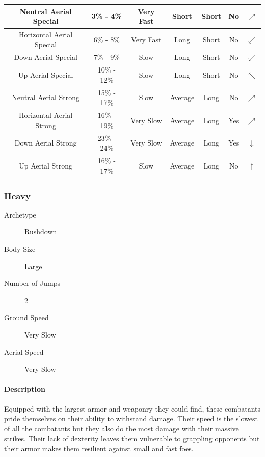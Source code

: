 \begin{table}[h!]
\begin{tabular}{| c | c | c | c | c | c | c |}
        Neutral Aerial Special & 3\% - 4\% & Very Fast & Short & Short & No & $\nearrow$ \\
        \hline
        Horizontal Aerial Special & 6\% - 8\% & Very Fast & Long & Short & No & $\swarrow$ \\
        \hline
        Down Aerial Special & 7\% - 9\% & Slow & Long & Short & No & $\swarrow$ \\
        \hline
        Up Aerial Special & 10\% - 12\% & Slow & Long & Short & No & $\nwarrow$ \\
        \hline
        Neutral Aerial Strong & 15\% - 17\% & Slow & Average & Long & No & $\nearrow$ \\
        \hline
        Horizontal Aerial Strong & 16\% - 19\% & Very Slow & Average & Long & Yes & $\nearrow$ \\
        \hline
        Down Aerial Strong & 23\% - 24\% & Very Slow & Average & Long & Yes & $\downarrow$ \\
        \hline
        Up Aerial Strong & 16\% - 17\% & Slow & Average & Long & No & $\uparrow$ \\
        \hline
    \end{tabular}
\end{table}

\pagebreak

\subsubsection{Heavy}

\begin{description}
    \item[Archetype] Rushdown
    \item[Body Size] Large
    \item[Number of Jumps] 2
    \item[Ground Speed] Very Slow
    \item[Aerial Speed] Very Slow   
\end{description}

\paragraph{Description} Equipped with the largest armor and weaponry they could find, these combatants pride themselves on their ability to withstand damage. Their speed is the slowest of all the combatants but they also do the most damage with their massive strikes. Their lack of dexterity leaves them vulnerable to grappling opponents but their armor makes them resilient against small and fast foes.

